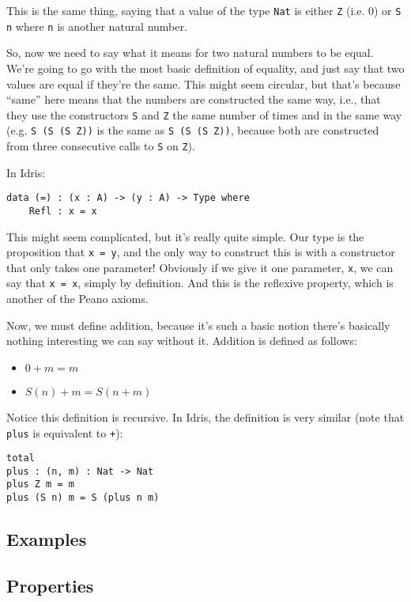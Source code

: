 \documentclass{article}
\newcommand{\inline}[1]{\texttt{#1}}
\begin{document}
This is the same thing, saying that a value of the type \inline{Nat} is either \inline{Z} (i.e. 0) or \inline{S n} where \inline{n} is another natural number.

So, now we need to say what it means for two natural numbers to be equal.
We're going to go with the most basic definition of equality, and just say that two values are equal if they're the same.
This might seem circular, but that's because ``same'' here means that the numbers are constructed the same way, i.e., that they use the constructors \inline{S} and \inline{Z} the same number of times and in the same way (e.g. \inline{S (S (S Z))} is the same as \inline{S (S (S Z))}, because both are constructed from three consecutive calls to \inline{S} on \inline{Z}).

In Idris:
\begin{verbatim}
data (=) : (x : A) -> (y : A) -> Type where
    Refl : x = x
\end{verbatim}

This might seem complicated, but it's really quite simple.
Our type is the proposition that \inline{x = y}, and the only way to construct this is with a constructor that only takes one parameter!
Obviously if we give it one parameter, \inline{x}, we can say that \inline{x = x}, simply by definition.
And this is the reflexive property, which is another of the Peano axioms.

Now, we must define addition, because it's such a basic notion there's basically nothing interesting we can say without it.
Addition is defined as follows:

\begin{itemize}
    \item[] $0 + m = m$
    \item[] $S(n) + m = S(n + m)$
\end{itemize}

Notice this definition is recursive.
In Idris, the definition is very similar (note that \inline{plus} is equivalent to \inline{+}):

\begin{verbatim}
total
plus : (n, m) : Nat -> Nat
plus Z m = m
plus (S n) m = S (plus n m)
\end{verbatim}

\subsection{Examples}

\subsection{Properties}
\end{document}
